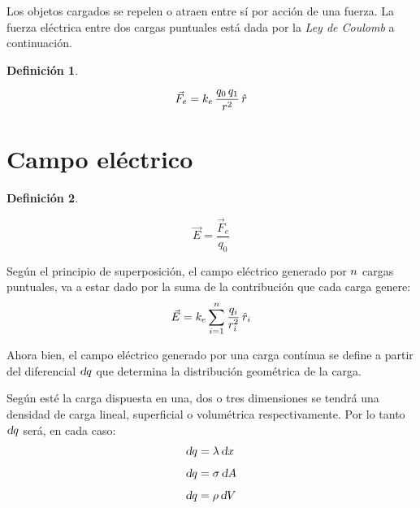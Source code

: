 \documentclass[a5paper,12pt,twoside]{book}
\newtheorem{defn}{{Definición}}[chapter]
\begin{document}
Los objetos cargados se repelen o atraen entre sí por acción de una fuerza.
La fuerza eléctrica entre dos cargas puntuales está dada por la \emph{Ley de Coulomb} a continuación.

\begin{mdframed}[style=MyFrame1]
    \begin{defn}
    \end{defn}
    \begin{equation*}
        \Vec{F}_e = k_e \, \frac{ q_0 \, q_1}{r^2} \, \hat{r}
    \end{equation*}
\end{mdframed}


\section{Campo eléctrico}

\begin{mdframed}[style=MyFrame1]
    \begin{defn}
    \end{defn}
    \begin{equation*}
        \Vec{E} = \frac{\Vec{F}_e}{q_0}
    \end{equation*}
\end{mdframed}

Según el principio de superposición, el campo eléctrico generado por $n$ cargas puntuales, va a estar dado por la suma de la contribución que cada carga genere:
\begin{equation}
    \Vec{E}= k_e \sum_{i=1}^n \frac{q_i}{r_i^2} \, \hat{r}_i
\end{equation}

Ahora bien, el campo eléctrico generado por una carga contínua se define a partir del diferencial $\textsl{d} q$ que determina la distribución geométrica de la carga.

Según esté la carga dispuesta en una, dos o tres dimensiones se tendrá una densidad de carga lineal, superficial o volumétrica respectivamente. Por lo tanto $\textsl{d} q$ será, en cada caso:
\begin{align*}
    \textsl{d} q &= \lambda \, \textsl{d} x
    \\[1ex]
    \textsl{d} q &= \sigma \, \textsl{d} A
    \\[1ex]
    \textsl{d} q &= \rho \, \textsl{d} V
\end{align*}
\end{document}
